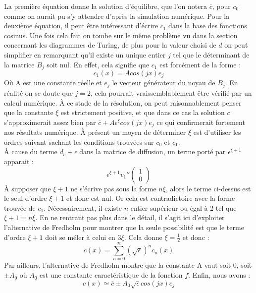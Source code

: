 \documentclass[12pt,a4paper]{article}
\begin{document}
La première équation donne la solution d'équilibre, que l'on notera $\overline{c} $, pour $c_0$ comme on aurait pu s'y attendre d'après la simulation numérique. Pour la deuxième équation, il peut être intéressant d'écrire $c_1$ dans la base des fonctions cosinus. Une fois cela fait on tombe sur le même problème vu dans la section concernant les diagrammes de Turing, de plus pour la valeur choisi de $d$ on peut simplifier en remarquant qu'il existe un unique entier $j$ tel que le déterminant de la matrice $B_j$ soit nul. En effet, cela signifie que $c_1$ est forcément de la forme : 
\begin{equation}
c_1(x) = A cos(jx)e_j
\end{equation}
Où A est une constante réelle et $e_j$ le vecteur générateur du noyau de $B_j$.  En réalité on se doute que $j=2$, cela pourrait vraissemblablement être vérifié par un calcul numérique. À ce stade de la résolution, on peut raisonnablement penser que la constante $\xi$ est strictement positive, et que dans ce cas la solution $c$ s'approximerait assez bien par $\overline{c} + A \epsilon^{\xi} cos(jx)e_j$ ce qui confirmerait fortement nos résultats numérique. À présent un moyen de déterminer $\xi$ est d'utiliser les ordres suivant sachant les conditions trouvées sur $c_0$ et $c_1$. \\

À cause du terme $d_c + \epsilon$ dans la matrice de diffusion, un terme porté par $\epsilon^{\xi +1}$ apparait : 
\begin{equation}
\epsilon^{\xi +1} v_1 ''   \begin{pmatrix}
        1 \\
        0 
        \end{pmatrix} 
\end{equation}
À supposer que $\xi +1$ ne s'écrive pas sous la forme $n\xi$, alors le terme ci-dessus est le seul d'ordre $\xi +1$ et donc est nul. Or cela est contradictoire avec la forme trouvée de $c_1$. Nécessairement, il existe $n$ entier supérieur ou égal à 2 tel que $\xi+1=n\xi$. En ne rentrant pas plus dans le détail, il s'agit ici d'exploiter l'alternative de Fredholm pour montrer que la seule possibilité est que le terme d'ordre $\xi+1$ doit se méler à celui en $3\xi$. Cela donne $\xi=\frac{1}{2}$ et donc : 
\begin{equation}
c(x) = \sum_{n=0}^{\infty} (\sqrt{\epsilon})^n c_n (x)
\end{equation}
Par ailleurs, l'alternative de Fredholm montre que la constante A vaut soit $0$, soit $\pm A_0$ où $A_0$ est une constante caractéristique de la fonction $f$. Enfin, nous avons :
\begin{equation}
c(x)\simeq\overline{c} \pm A_0 \sqrt{\epsilon} cos(jx)e_j
\end{equation}
\end{document}
